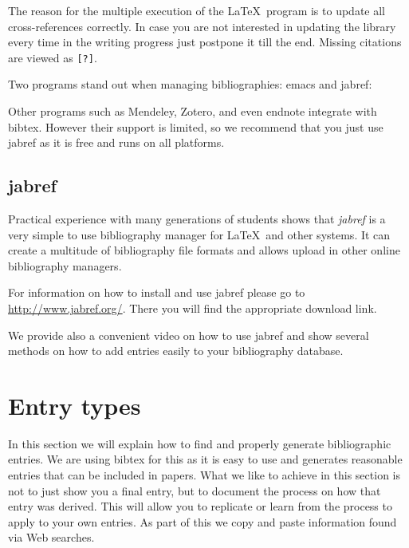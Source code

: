 The reason for the multiple execution of the \LaTeX\ program is to update
all cross-references correctly. In case you are not interested in
updating the library every time in the writing progress just postpone it
till the end. Missing citations are viewed as \verb|[?]|.

Two programs stand out when managing bibliographies: emacs and jabref:


Other programs such as Mendeley, Zotero, and even endnote integrate with
bibtex. However their support is limited, so we recommend that you just
use jabref as it is free and runs on all platforms.

\subsection{jabref}
\label{s:jabref}


Practical experience with many generations of students shows that
\textit{jabref} is a very simple to use bibliography manager for \LaTeX\ and
other systems. It can create a multitude of bibliography file formats
and allows upload in other online bibliography managers.

For information on how to install and use jabref please go to 
\url{http://www.jabref.org/}. There you will find the appropriate
download link.

We provide also a convenient video on how to use jabref and show
several methods on how to add entries easily to your bibliography database.




\section{Entry types}

In this section we will explain how to find and properly generate
bibliographic entries. We are using bibtex for this as it is easy to
use and generates reasonable entries that can be included in
papers. What we like to achieve in this section is not to just show
you a final entry, but to document the process on how that entry was
derived. This will allow you to replicate or learn from the process to
apply to your own entries. As part of this we copy and paste
information found via Web searches.

